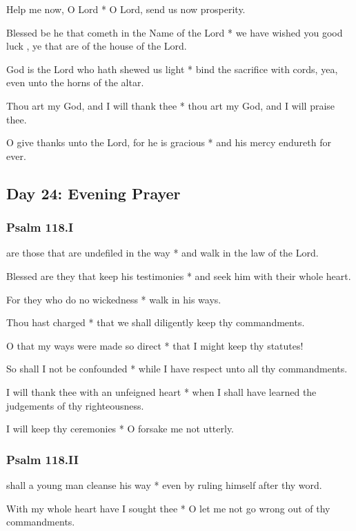 Help me now, O Lord * O Lord, send us now prosperity.

Blessed be he that cometh in the Name of the Lord * we have wished you good luck , ye that are of the house of the Lord.

God is the Lord who hath shewed us light * bind the sacrifice with cords, yea, even unto the horns of the altar.

Thou art my God, and I will thank thee * thou art my God, and I will praise thee.

O give thanks unto the Lord, for he is gracious * and his mercy endureth for ever.

\subsection{Day 24: Evening Prayer}

\subsubsection{Psalm 118.I}


 are those that are undefiled in the way * and walk in the law of the Lord.

Blessed are they that keep his testimonies * and seek him with their whole heart.

For they who do no wickedness * walk in his ways.

Thou hast charged * that we shall diligently keep thy commandments.

O that my ways were made so direct * that I might keep thy statutes!

So shall I not be confounded * while I have respect unto all thy commandments.

I will thank thee with an unfeigned heart * when I shall have learned the judgements of thy righteousness.

I will keep thy ceremonies * O forsake me not utterly.

\subsubsection{Psalm 118.II}

 shall a young man cleanse his way * even by ruling himself after thy word.

With my whole heart have I sought thee * O let me not go wrong out of thy commandments.

